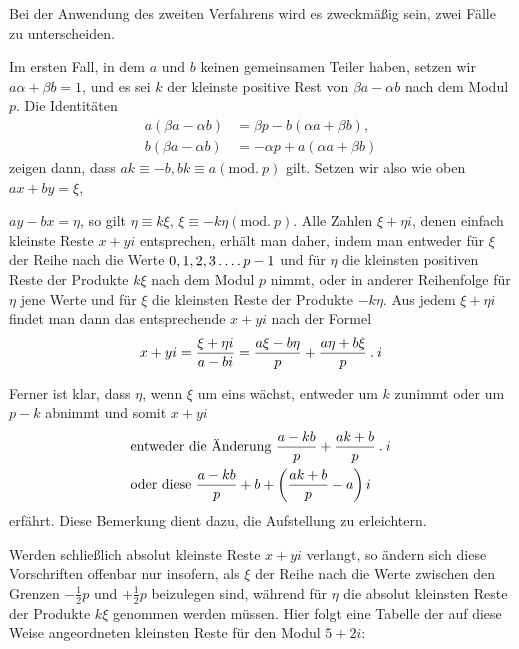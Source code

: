 Bei der Anwendung des zweiten Verfahrens wird es zweckmäßig sein, zwei Fälle zu unterscheiden.

Im ersten Fall, in dem $a$ und $b$ keinen gemeinsamen Teiler haben, setzen wir $a\alpha+\beta b=1$, und es sei $k$ der kleinste positive Rest von $\beta a-\alpha b$ nach dem Modul $p$. Die Identitäten
\[
\begin{aligned}
a(\beta a-\alpha b)&=\beta p-b(\alpha a+\beta b),\\
b(\beta a-\alpha b)&=-\alpha p+a(\alpha a+\beta b)
\end{aligned}
\]
zeigen dann, dass $ak\equiv-b,bk\equiv a(\mathrm{mod.}\ p)$ gilt. Setzen wir also wie oben $ax+by=\xi$,

%
$ay-bx=\eta$, so gilt $\eta\equiv k\xi$, $\xi\equiv-k\eta(\mathrm{mod.}\ p)$. Alle Zahlen $\xi+\eta i$, denen einfach kleinste Reste $x+yi$ entsprechen, erhält man daher, indem man entweder für $\xi$ der Reihe nach die Werte $0,1,2,3\mathinner{.\,.\,.\,.} p-1$ und für $\eta$ die kleinsten positiven Reste der Produkte $k\xi$ nach dem Modul $p$ nimmt, oder in anderer Reihenfolge für $\eta$ jene Werte und für $\xi$ die kleinsten Reste der Produkte $-k\eta$. Aus jedem $\xi+\eta i$ findet man dann das entsprechende $x+yi$ nach der Formel
\[
x+yi=\frac{\xi+\eta i}{a-bi}=\frac{a\xi-b\eta}{p}+\frac{a\eta+b\xi}{p}\mathbin{.} i
\]

\begingroup{}\relax
Ferner ist klar, dass $\eta$, wenn $\xi$ um eins wächst, entweder um $k$ zunimmt oder um $p-k$ abnimmt und somit $x+yi$
\[
\begin{aligned}
&\text{entweder die Änderung }\frac{a-kb}{p}+\frac{ak+b}{p}\mathbin{.} i\\
&\text{oder diese }\frac{a-kb}{p}+b+\left(\frac{ak+b}{p}-a\right)i
\end{aligned}
\]
erfährt. Diese Bemerkung dient dazu, die Aufstellung zu erleichtern.\endgroup

Werden schließlich absolut kleinste Reste $x+yi$ verlangt, so ändern sich diese Vorschriften offenbar nur insofern, als $\xi$ der Reihe nach die Werte zwischen den Grenzen $-\frac12p$ und $+\frac12p$ beizulegen sind, während für $\eta$ die absolut kleinsten Reste der Produkte $k\xi$ genommen werden müssen. Hier folgt eine Tabelle der auf diese Weise angeordneten kleinsten Reste für den Modul $5+2i$:

